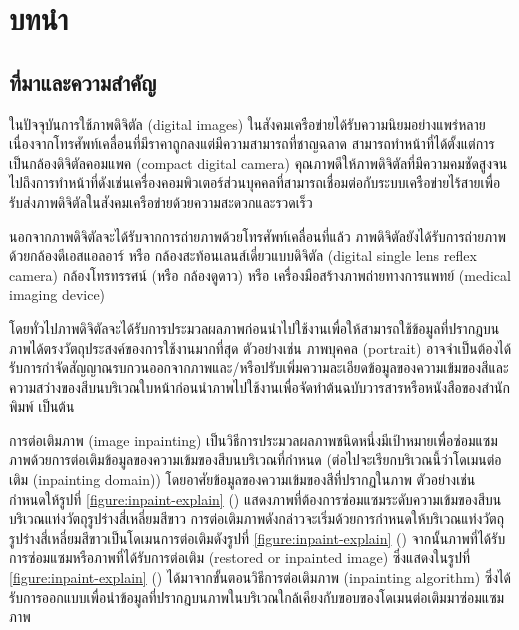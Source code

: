 \chapter{บทนำ}
\section{ที่มาและความสำคัญ}

\hspace{1cm} ในปัจจุบันการใช้ภาพดิจิตัล (digital images) ในสังคมเครือข่ายได้รับความนิยมอย่างแพร่หลาย เนื่องจากโทรศัพท์เคลื่อนที่มีราคาถูกลงแต่มีความสามารถที่ชาญฉลาด สามารถทำหน้าที่ได้ตั้งแต่การเป็นกล้องดิจิตัลคอมแพค (compact digital camera)  คุณภาพดีให้ภาพดิจิตัลที่มีความคมชัดสูงจนไปถึงการทำหน้าที่ดังเช่นเครื่องคอมพิวเตอร์ส่วนบุคคลที่สามารถเชื่อมต่อกับระบบเครือข่ายไร้สายเพื่อรับส่งภาพดิจิตัลในสังคมเครือข่ายด้วยความสะดวกและรวดเร็ว

\hspace{1cm} นอกจากภาพดิจิตัลจะได้รับจากการถ่ายภาพด้วยโทรศัพท์เคลื่อนที่แล้ว ภาพดิจิตัลยังได้รับการถ่ายภาพด้วยกล้องดีเอสแอลอาร์ หรือ กล้องสะท้อนเลนส์เดี่ยวแบบดิจิตัล (digital single lens reflex camera) กล้องโทรทรรศน์ (หรือ กล้องดูดาว) หรือ เครื่องมือสร้างภาพถ่ายทางการแพทย์ (medical imaging device) 

\hspace{1cm} โดยทั่วไปภาพดิจิตัลจะได้รับการประมวลผลภาพก่อนนำไปใช้งานเพื่อให้สามารถใช้ข้อมูลที่ปรากฎบนภาพได้ตรงวัตถุประสงค์ของการใช้งานมากที่สุด ตัวอย่างเช่น ภาพบุคคล (portrait) อาจจำเป็นต้องได้รับการกำจัดสัญญาณรบกวนออกจากภาพและ/หรือปรับเพิ่มความละเอียดข้อมูลของความเข้มของสีและความสว่างของสีบนบริเวณใบหน้าก่อนนำภาพไปใช้งานเพื่อจัดทำต้นฉบับวารสารหรือหนังสือของสำนักพิมพ์ เป็นต้น  

\hspace{1cm} การต่อเติมภาพ (image inpainting) เป็นวิธีการประมวลผลภาพชนิดหนึ่งมีเป้าหมายเพื่อซ่อมแซมภาพด้วยการต่อเติมข้อมูลของความเข้มของสีบนบริเวณที่กำหนด (ต่อไปจะเรียกบริเวณนี้ว่าโดเมนต่อเติม (inpainting domain)) โดยอาศัยข้อมูลของความเข้มของสีที่ปรากฏในภาพ ตัวอย่างเช่น 
กำหนดให้รูปที่ \ref{figure:inpaint-explain} () แสดงภาพที่ต้องการซ่อมแซมระดับความเข้มของสีบนบริเวณแท่งวัตถุรูปร่างสี่เหลี่ยมสีขาว การต่อเติมภาพดังกล่าวจะเริ่มด้วยการกำหนดให้บริเวณแท่งวัตถุรูปร่างสี่เหลี่ยมสีขาวเป็นโดเมนการต่อเติมดังรูปที่ \ref{figure:inpaint-explain} ()  จากนั้นภาพที่ได้รับการซ่อมแซมหรือภาพที่ได้รับการต่อเติม (restored or inpainted image) ซึ่งแสดงในรูปที่ \ref{figure:inpaint-explain} () ได้มาจากขั้นตอนวิธีการต่อเติมภาพ (inpainting algorithm) ซึ่งได้รับการออกแบบเพื่อนำข้อมูลที่ปรากฎบนภาพในบริเวณใกล้เคียงกับขอบของโดเมนต่อเติมมาซ่อมแซมภาพ 
	
